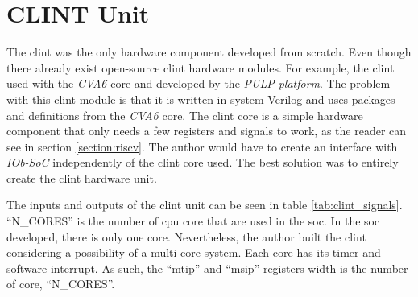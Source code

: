 \section{CLINT Unit}
\label{section:clint}
The \acrshort{clint} was the only hardware component developed from scratch. Even though there already exist open-source \acrfull{clint} hardware modules. For example, the \acrshort{clint} used with the \textit{CVA6} core and developed by the \textit{PULP platform}. The problem with this \acrshort{clint} module is that it is written in system-Verilog and uses packages and definitions from the \textit{CVA6} core. The \acrshort{clint} core is a simple hardware component that only needs a few registers and signals to work, as the reader can see in section \ref{section:riscv}. The author would have to create an interface with \textit{IOb-SoC} independently of the \acrshort{clint} core used. The best solution was to entirely create the \acrshort{clint} hardware unit.

The inputs and outputs of the \acrshort{clint} unit can be seen in table \ref{tab:clint_signals}. \enquote{N\_CORES} is the number of \acrshort{cpu} core that are used in the \acrshort{soc}. In the \acrfull{soc} developed, there is only one core. Nevertheless, the author built the \acrshort{clint} considering a possibility of a multi-core system. Each core has its timer and software interrupt. As such, the \enquote{mtip} and \enquote{msip} registers width is the number of core, \enquote{N\_CORES}.

